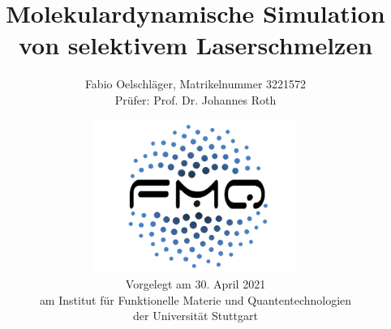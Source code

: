 \documentclass{thesis}
\title{Molekulardynamische Simulation von selektivem Laserschmelzen}
\author{
	Fabio Oelschläger, Matrikelnummer 3221572\\
	Prüfer: Prof. Dr. Johannes Roth
}
\date{
	\vspace{1cm}
	\includegraphics[width=0.5\textwidth]{fmq-logo.png}\\
	\vspace{1cm}
	Vorgelegt am 30. April 2021\\
	am Institut für Funktionelle Materie und Quantentechnologien\\
	der Universität Stuttgart
}
\begin{document}
	\frontmatter
	\begin{titlepage}
		\maketitle
	\end{titlepage}

	

	\tableofcontents

	\mainmatter
	

	\backmatter
	
\end{document}

